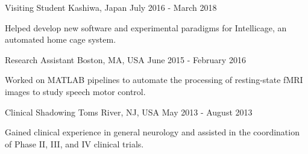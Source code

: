 \begin{cventries}
    \vspace*{0.1cm}

    {Visiting Student}
    {Kashiwa, Japan}
    {July 2016 - March 2018}
    {\begin{cvitems}
        \item Helped develop new software and experimental paradigms for Intellicage, an automated home cage system.
    \end{cvitems}\vspace{1.5\baselineskip}}

    \vspace*{0.1cm}

    {Research Assistant}
    {Boston, MA, USA}
    {June 2015 - February 2016}
    {\begin{cvitems}
        \item Worked on MATLAB pipelines to automate the processing of resting-state fMRI images to study speech motor control.
    \end{cvitems}\vspace{1.5\baselineskip}}

    \vspace*{0.1cm}
    
    {Clinical Shadowing}
    {Toms River, NJ, USA}
    {May 2013 - August 2013}
    {\begin{cvitems}
        \item Gained clinical experience in general neurology and assisted in the coordination of Phase II, III, and IV clinical trials.
    \end{cvitems}\vspace{1.5\baselineskip}}

\end{cventries}

\vspace*{0.3cm}

